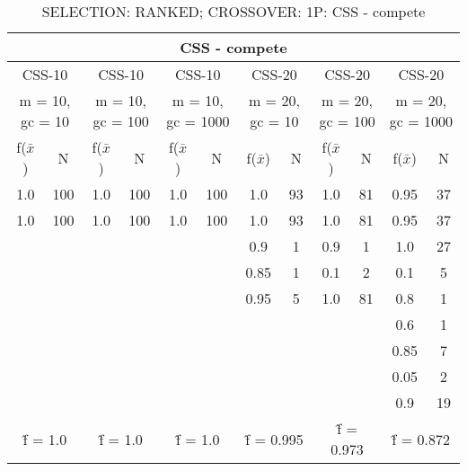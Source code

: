 \begin{table}[H]
	\centering
	\caption{SELECTION: RANKED; CROSSOVER: 1P: CSS - compete}
	\begin{adjustbox}{width=1\textwidth}
		\begin{tabular}{ |c|c||c|c||c|c||c|c||c|c||c|c| }
			\hline
			\multicolumn{12}{|c|}{CSS - compete} \\
			\hline
			\multicolumn{2}{|c||}{CSS-10} & \multicolumn{2}{c||}{CSS-10} & \multicolumn{2}{c||}{CSS-10} & \multicolumn{2}{c||}{CSS-20} & \multicolumn{2}{c||}{CSS-20} & \multicolumn{2}{c|}{CSS-20}\\
			\hline
			\multicolumn{2}{|c||}{m = 10, gc = 10} & \multicolumn{2}{c||}{m = 10, gc = 100} & \multicolumn{2}{c||}{m = 10, gc = 1000} & \multicolumn{2}{c||}{m = 20, gc = 10} & \multicolumn{2}{c||}{m = 20, gc = 100} & \multicolumn{2}{c|}{m = 20, gc = 1000}\\
			\hline
			f($\bar{x}$) & N & f($\bar{x}$) & N & f($\bar{x}$) & N & f($\bar{x}$) & N & f($\bar{x}$) & N & f($\bar{x}$) & N\\
			\hline
			\hline
			1.0 & 100 & 1.0 & 100 & 1.0 & 100 & 1.0 & 93 & 1.0 & 81 & 0.95 & 37\\
			\hline
			1.0 & 100 & 1.0 & 100 & 1.0 & 100 & 1.0 & 93 & 1.0 & 81 & 0.95 & 37\\
			&   &   &   &   &   & 0.9 & 1 & 0.9 & 1 & 1.0 & 27\\
			&   &   &   &   &   & 0.85 & 1 & 0.1 & 2 & 0.1 & 5\\
			&   &   &   &   &   & 0.95 & 5 & 1.0 & 81 & 0.8 & 1\\
			&   &   &   &   &   &   &   &   &   & 0.6 & 1\\
			&   &   &   &   &   &   &   &   &   & 0.85 & 7\\
			&   &   &   &   &   &   &   &   &   & 0.05 & 2\\
			&   &   &   &   &   &   &   &   &   & 0.9 & 19\\
			\hline
			\multicolumn{2}{|c||}{\^{f} = 1.0} & \multicolumn{2}{c||}{\^{f} = 1.0} & \multicolumn{2}{c||}{\^{f} = 1.0} & \multicolumn{2}{c||}{\^{f} = 0.995} & \multicolumn{2}{c||}{\^{f} = 0.973} & \multicolumn{2}{c|}{\^{f} = 0.872}\\
			\hline
		\end{tabular}
	\end{adjustbox}
\end{table}
